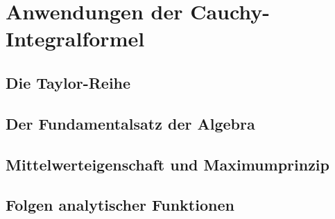 \section{Anwendungen der Cauchy-Integralformel}

\subsection{Die Taylor-Reihe}

\subsection{Der Fundamentalsatz der Algebra}

\subsection{Mittelwerteigenschaft und Maximumprinzip}

\subsection{Folgen analytischer Funktionen}
